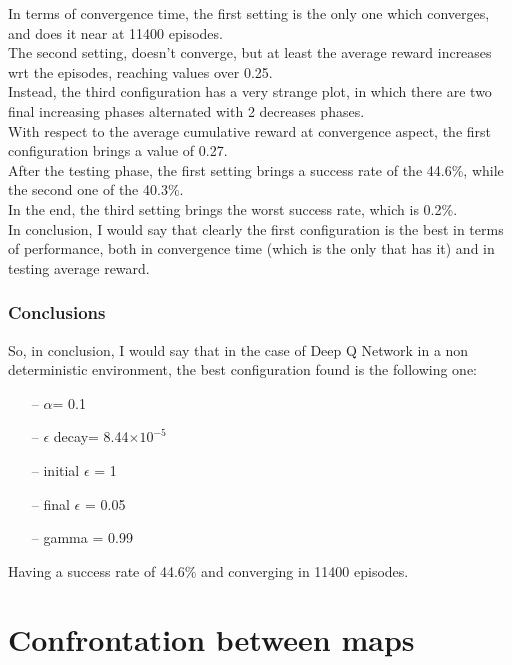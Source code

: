\documentclass{article}
\begin{document}
In terms of convergence time, the first setting is the only one which converges, and does it near at 11400 episodes.
\\
The second setting, doesn't converge, but at least the average reward increases wrt the episodes, reaching values over 0.25.
\\
Instead, the third configuration has a very strange plot, in which there are two final increasing phases alternated with 2 decreases phases.
\\
With respect to the average cumulative reward at convergence aspect, the first configuration brings a value of 0.27.
\\
After the testing phase, the first setting brings a success rate of the 44.6\%, while the second one of the 40.3\%.
\\
In the end, the third setting brings the worst success rate, which is 0.2\%.
\\
In conclusion, I would say that clearly the first configuration is the best in terms of performance, both in convergence time (which is the only that has it) and in testing average reward.



\subsubsection{Conclusions}

So, in conclusion, I would say that in the case of Deep Q Network in a non deterministic environment, the best configuration found is the following one:

\begin{itemize}
\item[--] $\alpha$= 0.1
\item[--] $\epsilon$ decay= 8.44$\times10^{-5}$
\item[--] initial $\epsilon$ = 1
\item[--] final $\epsilon$ = 0.05
\item[--] gamma = 0.99
\end{itemize}

Having a success rate of 44.6\% and converging in 11400 episodes.


\section{Confrontation between maps}
\end{document}
